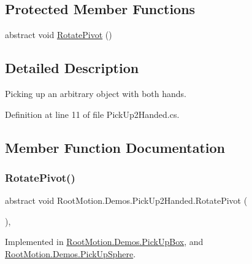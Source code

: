 \subsection*{Protected Member Functions}
\begin{DoxyCompactItemize}
\item 
abstract void \mbox{\hyperlink{class_root_motion_1_1_demos_1_1_pick_up2_handed_af2cd4f4a54d4b2ee2d566f5541946f82}{Rotate\+Pivot}} ()
\end{DoxyCompactItemize}


\subsection{Detailed Description}
Picking up an arbitrary object with both hands. 



Definition at line 11 of file Pick\+Up2\+Handed.\+cs.



\subsection{Member Function Documentation}
\mbox{\label{class_root_motion_1_1_demos_1_1_pick_up2_handed_af2cd4f4a54d4b2ee2d566f5541946f82}} 
\subsubsection{\texorpdfstring{Rotate\+Pivot()}{RotatePivot()}}
{\footnotesize\ttfamily abstract void Root\+Motion.\+Demos.\+Pick\+Up2\+Handed.\+Rotate\+Pivot (\begin{DoxyParamCaption}{ }\end{DoxyParamCaption})\hspace{0.3cm}{\ttfamily [protected]}, {}}



Implemented in \mbox{\hyperlink{class_root_motion_1_1_demos_1_1_pick_up_box_a0533d1ab1f95c6a422316b9610759856}{Root\+Motion.\+Demos.\+Pick\+Up\+Box}}, and \mbox{\hyperlink{class_root_motion_1_1_demos_1_1_pick_up_sphere_a88380e1448b6e564dfb99a1dacf91571}{Root\+Motion.\+Demos.\+Pick\+Up\+Sphere}}.



